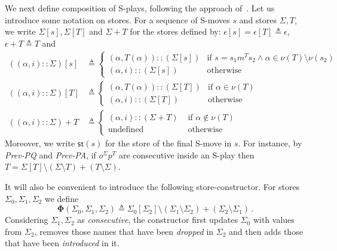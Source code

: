 \documentclass{CSML}
\theoremstyle{definition}\newtheorem{definition}[thm]{Definition}
\theoremstyle{definition}\newtheorem{example}[thm]{Example}
\theoremstyle{definition}\newtheorem{proposition}[thm]{Proposition}
\theoremstyle{definition}\newtheorem{lemma}[thm]{Lemma}
\theoremstyle{definition}\newtheorem{theorem}[thm]{Theorem}
\theoremstyle{definition}\newtheorem{corollary}[thm]{Corollary}
\theoremstyle{definition}\newtheorem{remark}[thm]{Remark}
\newcommand\nt[1]{#1}
\renewcommand\Sigma{\varSigma}
\newcommand\Tau{T}
\newcommand\defn{\triangleq}
\newcommand\ee\epsilon
\newcommand\remv{\setminus}
\newcommand\nice{\boldsymbol\Phi}
\newcommand\st[1]{\mathsf{st}(#1)}
\newcommand\na\alpha
\begin{document}
We next define composition of S-plays, following the approach of~\cite{HY97,Tze09}. Let us introduce some notation on stores. For a sequence of S-moves $s$ and stores $\Sigma,\Tau$, we write $\Sigma[s],\Sigma[\Tau]$ and $\Sigma+\Tau$ for the stores defined by: $\ee[s]=\ee[\Tau]\defn\ee$, $\ee+\Tau\defn\Tau$ and
\begin{align*}
((\na,i)::\Sigma)[s] &\defn 
\begin{cases}(\na,\Tau(\na))::(\Sigma[s]) &\text{if }s=s_1m^\Tau s_2\land\na\in\nu(\Tau)\setminus\nu(s_2)\\ (\na,i)::(\Sigma[s]) &\text{otherwise}
\end{cases}\\  
((\na,i)::\Sigma)[\Tau] &\defn
    \begin{cases}(\na,\Tau(\na))::(\Sigma[\Tau]) &\text{if }\na\in\nu(\Tau)\\ (\na,i)::(\Sigma[\Tau]) &\text{otherwise}\end{cases} \\
((\na,i)::\Sigma)+\Tau &\defn
\begin{cases}
(\na,i)::(\Sigma+\Tau) &\text{ if }\na\notin\nu(\Tau)\\ \text{undefined} &\text{ otherwise}
\end{cases}
\end{align*}
Moreover, we write $\st{s}$ for the store of the final S-move in $s$. 
\nt{For instance, by {\em Prev-PQ} and {\em Prev-PA}, if $o^\Sigma p^\Tau$ are consecutive inside an S-play then $\Tau=\Sigma[\Tau]\setminus(\Sigma\setminus\Tau)+(\Tau\setminus\Sigma)$.}

It will also be convenient 
to introduce the following store-constructor. For stores $\Sigma_0,\Sigma_1,\Sigma_2$ we define
\[ \nice(\Sigma_0,\Sigma_1,\Sigma_2) \defn \Sigma_0[\Sigma_2]\remv(\Sigma_1\remv\Sigma_2)+(\Sigma_2\remv\Sigma_1)\,.\]
Considering $\Sigma_1,\Sigma_2$ as \emph{consecutive},
the constructor first updates $\Sigma_0$ with values from $\Sigma_2$, removes those names that have been \emph{dropped} in $\Sigma_2$ and then adds those that have been \emph{introduced} in it.
\end{document}
